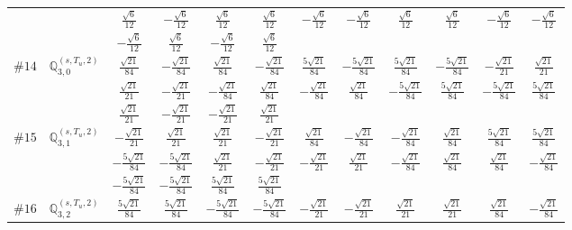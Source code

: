 \documentclass[fleqn,9pt,landscape]{jsarticle}
\begin{document}
\begin{center}
\begin{longtable}{lcccccccccc}
& $ \frac{\sqrt{6}}{12} $ & $ - \frac{\sqrt{6}}{12} $ & $ \frac{\sqrt{6}}{12} $ & $ \frac{\sqrt{6}}{12} $ & $ - \frac{\sqrt{6}}{12} $ & $ - \frac{\sqrt{6}}{12} $ & $ \frac{\sqrt{6}}{12} $ & $ \frac{\sqrt{6}}{12} $ & $ - \frac{\sqrt{6}}{12} $ & $ - \frac{\sqrt{6}}{12} $ \\
& $ - \frac{\sqrt{6}}{12} $ & $ \frac{\sqrt{6}}{12} $ & $ - \frac{\sqrt{6}}{12} $ & $ \frac{\sqrt{6}}{12} $ & $  $ & $  $ & $  $ & $  $ & $  $ & $  $ \\ \hline
$ \#14\quad \mathbb{Q}_{3,0}^{(s,T_{u},2)} $ & $ \frac{\sqrt{21}}{84} $ & $ - \frac{\sqrt{21}}{84} $ & $ \frac{\sqrt{21}}{84} $ & $ - \frac{\sqrt{21}}{84} $ & $ \frac{5 \sqrt{21}}{84} $ & $ - \frac{5 \sqrt{21}}{84} $ & $ \frac{5 \sqrt{21}}{84} $ & $ - \frac{5 \sqrt{21}}{84} $ & $ - \frac{\sqrt{21}}{21} $ & $ \frac{\sqrt{21}}{21} $ \\
& $ \frac{\sqrt{21}}{21} $ & $ - \frac{\sqrt{21}}{21} $ & $ - \frac{\sqrt{21}}{84} $ & $ \frac{\sqrt{21}}{84} $ & $ - \frac{\sqrt{21}}{84} $ & $ \frac{\sqrt{21}}{84} $ & $ - \frac{5 \sqrt{21}}{84} $ & $ \frac{5 \sqrt{21}}{84} $ & $ - \frac{5 \sqrt{21}}{84} $ & $ \frac{5 \sqrt{21}}{84} $ \\
& $ \frac{\sqrt{21}}{21} $ & $ - \frac{\sqrt{21}}{21} $ & $ - \frac{\sqrt{21}}{21} $ & $ \frac{\sqrt{21}}{21} $ & $  $ & $  $ & $  $ & $  $ & $  $ & $  $ \\ \hline
$ \#15\quad \mathbb{Q}_{3,1}^{(s,T_{u},2)} $ & $ - \frac{\sqrt{21}}{21} $ & $ \frac{\sqrt{21}}{21} $ & $ \frac{\sqrt{21}}{21} $ & $ - \frac{\sqrt{21}}{21} $ & $ \frac{\sqrt{21}}{84} $ & $ - \frac{\sqrt{21}}{84} $ & $ - \frac{\sqrt{21}}{84} $ & $ \frac{\sqrt{21}}{84} $ & $ \frac{5 \sqrt{21}}{84} $ & $ \frac{5 \sqrt{21}}{84} $ \\
& $ - \frac{5 \sqrt{21}}{84} $ & $ - \frac{5 \sqrt{21}}{84} $ & $ \frac{\sqrt{21}}{21} $ & $ - \frac{\sqrt{21}}{21} $ & $ - \frac{\sqrt{21}}{21} $ & $ \frac{\sqrt{21}}{21} $ & $ - \frac{\sqrt{21}}{84} $ & $ \frac{\sqrt{21}}{84} $ & $ \frac{\sqrt{21}}{84} $ & $ - \frac{\sqrt{21}}{84} $ \\
& $ - \frac{5 \sqrt{21}}{84} $ & $ - \frac{5 \sqrt{21}}{84} $ & $ \frac{5 \sqrt{21}}{84} $ & $ \frac{5 \sqrt{21}}{84} $ & $  $ & $  $ & $  $ & $  $ & $  $ & $  $ \\ \hline
$ \#16\quad \mathbb{Q}_{3,2}^{(s,T_{u},2)} $ & $ \frac{5 \sqrt{21}}{84} $ & $ \frac{5 \sqrt{21}}{84} $ & $ - \frac{5 \sqrt{21}}{84} $ & $ - \frac{5 \sqrt{21}}{84} $ & $ - \frac{\sqrt{21}}{21} $ & $ - \frac{\sqrt{21}}{21} $ & $ \frac{\sqrt{21}}{21} $ & $ \frac{\sqrt{21}}{21} $ & $ \frac{\sqrt{21}}{84} $ & $ - \frac{\sqrt{21}}{84} $ \\

\end{longtable}
\end{center}
\end{document}
